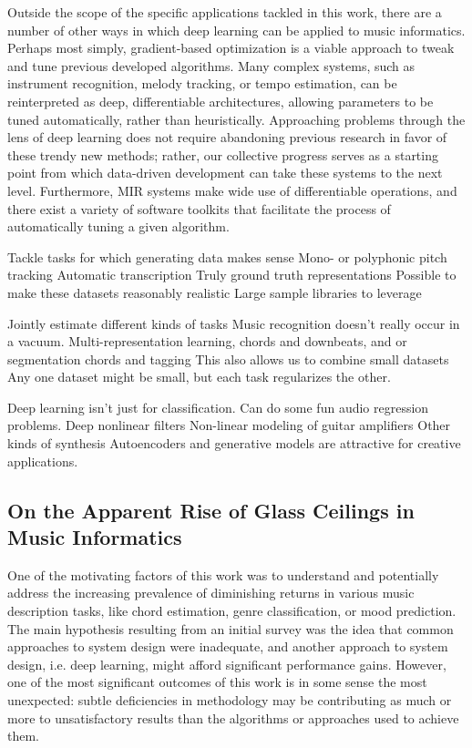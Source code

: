 Outside the scope of the specific applications tackled in this work, there are a number of other ways in which deep learning can be applied to music informatics.
Perhaps most simply, gradient-based optimization is a viable approach to tweak and tune previous developed algorithms.
Many complex systems, such as instrument recognition, melody tracking, or tempo estimation, can be reinterpreted as deep, differentiable architectures, allowing parameters to be tuned automatically, rather than heuristically.
Approaching problems through the lens of deep learning does not require abandoning previous research in favor of these trendy new methods;
rather, our collective progress serves as a starting point from which data-driven development can take these systems to the next level.
Furthermore, MIR systems make wide use of differentiable operations, and there exist a variety of software toolkits that facilitate the process of automatically tuning a given algorithm.


Tackle tasks for which generating data makes sense
Mono- or polyphonic pitch tracking
Automatic transcription
Truly ground truth representations
Possible to make these datasets reasonably realistic
Large sample libraries to leverage

Jointly estimate different kinds of tasks
Music recognition doesn't really occur in a vacuum.
Multi-representation learning, chords and downbeats, and or segmentation
chords and tagging
This also allows us to combine small datasets
Any one dataset might be small, but each task regularizes the other.

Deep learning isn't just for classification.
Can do some fun audio regression problems.
Deep nonlinear filters
Non-linear modeling of guitar amplifiers
Other kinds of synthesis
Autoencoders and generative models are attractive for creative applications.


\subsection{On the Apparent Rise of Glass Ceilings in Music Informatics}

One of the motivating factors of this work was to understand and potentially address the increasing prevalence of diminishing returns in various music description tasks, like chord estimation, genre classification, or mood prediction.
The main hypothesis resulting from an initial survey was the idea that common approaches to system design were inadequate, and another approach to system design, i.e. deep learning, might afford significant performance gains.
However, one of the most significant outcomes of this work is in some sense the most unexpected:
subtle deficiencies in methodology may be contributing as much or more to unsatisfactory results than the algorithms or approaches used to achieve them.

